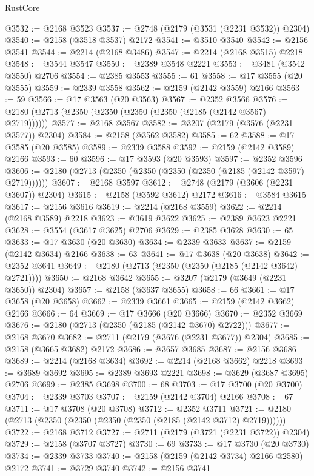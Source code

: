 \begin{lexlean}{RustCore}
\begin{coremodule}
@3532 := @2168 @3523
@3537 := @2748 (@2179 (@3531 (@2231 @3532)) @2304)
@3540 := @2158 (@3518 @3537) @2172
@3541 := @3510 @3540
@3542 := @2156 @3541
@3544 := @2214 (@2168 @3486)
@3547 := @2214 (@2168 @3515) @2218
@3548 := @3544 @3547
@3550 := @2389 @3548 @2221
@3553 := @3481 (@3542 @3550) @2706
@3554 := @2385 @3553
@3555 := 61
@3558 := @17 @3555 (@20 @3555)
@3559 := @2339 @3558
@3562 := @2159 (@2142 @3559) @2166
@3563 := 59
@3566 := @17 @3563 (@20 @3563)
@3567 := @2352 @3566
@3576 := @2180 (@2713 (@2350 (@2350 (@2350 (@2350 (@2185 (@2142 @3567) @2719))))))
@3577 := @2168 @3567
@3582 := @3207 (@2179 (@3576 (@2231 @3577)) @2304)
@3584 := @2158 (@3562 @3582)
@3585 := 62
@3588 := @17 @3585 (@20 @3585)
@3589 := @2339 @3588
@3592 := @2159 (@2142 @3589) @2166
@3593 := 60
@3596 := @17 @3593 (@20 @3593)
@3597 := @2352 @3596
@3606 := @2180 (@2713 (@2350 (@2350 (@2350 (@2350 (@2185 (@2142 @3597) @2719))))))
@3607 := @2168 @3597
@3612 := @2748 (@2179 (@3606 (@2231 @3607)) @2304)
@3615 := @2158 (@3592 @3612) @2172
@3616 := @3584 @3615
@3617 := @2156 @3616
@3619 := @2214 (@2168 @3559)
@3622 := @2214 (@2168 @3589) @2218
@3623 := @3619 @3622
@3625 := @2389 @3623 @2221
@3628 := @3554 (@3617 @3625) @2706
@3629 := @2385 @3628
@3630 := 65
@3633 := @17 @3630 (@20 @3630)
@3634 := @2339 @3633
@3637 := @2159 (@2142 @3634) @2166
@3638 := 63
@3641 := @17 @3638 (@20 @3638)
@3642 := @2352 @3641
@3649 := @2180 (@2713 (@2350 (@2350 (@2185 (@2142 @3642) @2721))))
@3650 := @2168 @3642
@3655 := @3207 (@2179 (@3649 (@2231 @3650)) @2304)
@3657 := @2158 (@3637 @3655)
@3658 := 66
@3661 := @17 @3658 (@20 @3658)
@3662 := @2339 @3661
@3665 := @2159 (@2142 @3662) @2166
@3666 := 64
@3669 := @17 @3666 (@20 @3666)
@3670 := @2352 @3669
@3676 := @2180 (@2713 (@2350 (@2185 (@2142 @3670) @2722)))
@3677 := @2168 @3670
@3682 := @2711 (@2179 (@3676 (@2231 @3677)) @2304)
@3685 := @2158 (@3665 @3682) @2172
@3686 := @3657 @3685
@3687 := @2156 @3686
@3689 := @2214 (@2168 @3634)
@3692 := @2214 (@2168 @3662) @2218
@3693 := @3689 @3692
@3695 := @2389 @3693 @2221
@3698 := @3629 (@3687 @3695) @2706
@3699 := @2385 @3698
@3700 := 68
@3703 := @17 @3700 (@20 @3700)
@3704 := @2339 @3703
@3707 := @2159 (@2142 @3704) @2166
@3708 := 67
@3711 := @17 @3708 (@20 @3708)
@3712 := @2352 @3711
@3721 := @2180 (@2713 (@2350 (@2350 (@2350 (@2350 (@2185 (@2142 @3712) @2719))))))
@3722 := @2168 @3712
@3727 := @2711 (@2179 (@3721 (@2231 @3722)) @2304)
@3729 := @2158 (@3707 @3727)
@3730 := 69
@3733 := @17 @3730 (@20 @3730)
@3734 := @2339 @3733
@3740 := @2158 (@2159 (@2142 @3734) @2166 @2580) @2172
@3741 := @3729 @3740
@3742 := @2156 @3741

\end{coremodule}
\end{lexlean}
